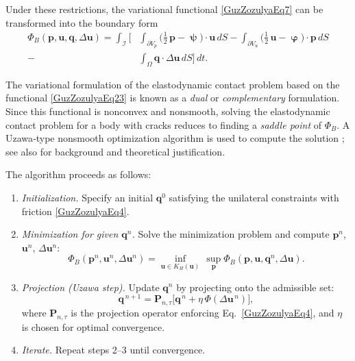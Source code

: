 Under these restrictions, the variational functional \eqref{GuzZozulyaEq7} can be transformed into the boundary form
\begin{align}
	\Phi_B(\mathbf{p},\mathbf{u},\mathbf{q},\Delta\mathbf{u}) =
	\int_{\mathcal{I}}
	\biggl[
	&\int_{\partial V_p} \bigl(\tfrac12\,\mathbf{p}-\bm{\uppsi}\bigr)\!\cdot\!\mathbf{u}\,dS
	-
	\int_{\partial V_u} \bigl(\tfrac12\,\mathbf{u}-\bm{\upvarphi}\bigr)\!\cdot\!\mathbf{p}\,dS
	\nonumber\\
	-&
	\int_{\Omega} \mathbf{q} \!\cdot\! \Delta\mathbf{u}\,dS
	\biggr]\,dt .
	\label{GuzZozulyaEq23}
\end{align}


The variational formulation of the elastodynamic contact problem based on the functional 
\eqref{GuzZozulyaEq23} is known as a \emph{dual} or \emph{complementary} formulation. 
Since this functional is nonconvex and nonsmooth, solving the elastodynamic contact problem for a body with cracks 
reduces to finding a \emph{saddle point} of $\Phi_B$. 
A Uzawa‐type nonsmooth optimization algorithm is used to compute the solution 
\cite{GuzZozulyaRef30}; see also \cite{GuzZozulyaRef7,GuzZozulyaRef12,GuzZozulyaRef21} 
for background and theoretical justification.

The algorithm proceeds as follows:

\begin{enumerate}
	\item \textit{Initialization.}  
	Specify an initial $\mathbf{q}^{0}$ satisfying the unilateral constraints with friction \eqref{GuzZozulyaEq4}.
	
	\item \textit{Minimization for given $\mathbf{q}^{n}$.}  
	Solve the minimization problem and compute $\mathbf{p}^{n}$, $\mathbf{u}^{n}$, $\Delta\mathbf{u}^{n}$:
	\begin{equation}\label{GuzZozulyaEq24}
		\Phi_B(\mathbf{p}^{n},\mathbf{u}^{n},\Delta\mathbf{u}^{n})
		=
		\inf_{\mathbf{u}\in K_H(\mathbf{u})}\,
		\sup_{\mathbf{p}}
		\Phi_B(\mathbf{p},\mathbf{u},\mathbf{q}^{n},\Delta\mathbf{u}) .
	\end{equation}
	
	\item \textit{Projection (Uzawa step).}  
	Update $\mathbf{q}^{n}$ by projecting onto the admissible set:
	\begin{equation}\label{GuzZozulyaEq25}
		\mathbf{q}^{\,n+1} 
		=
		\mathbf{P}_{n,\tau}\bigl[\mathbf{q}^{\,n} + \eta\, \Phi(\Delta\mathbf{u}^{\,n})\bigr],
	\end{equation}
	where $\mathbf{P}_{n,\tau}$ is the projection operator enforcing Eq.~\eqref{GuzZozulyaEq4}, 
	and $\eta$ is chosen for optimal convergence.
	
	\item \textit{Iterate.}  
	Repeat steps 2–3 until convergence.
\end{enumerate}

